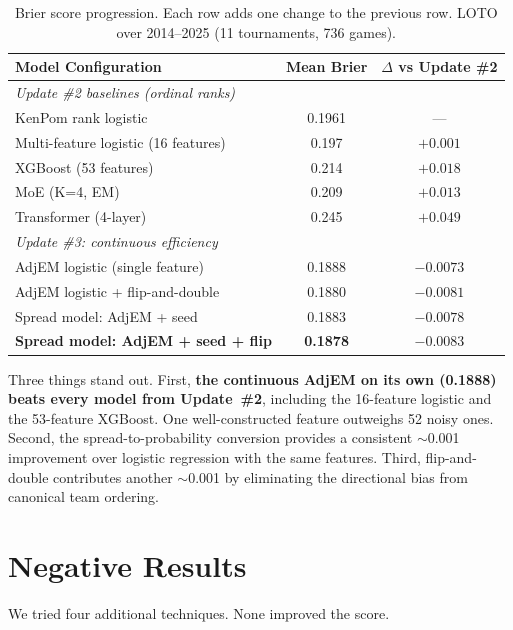 \documentclass[11pt,a4paper]{article}
\begin{document}
\begin{table}[ht]
\centering
\caption{Brier score progression. Each row adds one change to the previous row. LOTO over 2014--2025 (11 tournaments, 736 games).}
\label{tab:progression}
\small
\begin{tabular}{@{}lcc@{}}
\toprule
\textbf{Model Configuration} & \textbf{Mean Brier} & $\Delta$ \textbf{vs Update \#2} \\
\midrule
\multicolumn{3}{l}{\textit{Update \#2 baselines (ordinal ranks)}} \\
\quad KenPom rank logistic & 0.1961 & --- \\
\quad Multi-feature logistic (16 features) & 0.197 & $+0.001$ \\
\quad XGBoost (53 features) & 0.214 & $+0.018$ \\
\quad MoE (K=4, EM) & 0.209 & $+0.013$ \\
\quad Transformer (4-layer) & 0.245 & $+0.049$ \\
\midrule
\multicolumn{3}{l}{\textit{Update \#3: continuous efficiency}} \\
\quad AdjEM logistic (single feature) & 0.1888 & $-0.0073$ \\
\quad AdjEM logistic + flip-and-double & 0.1880 & $-0.0081$ \\
\quad Spread model: AdjEM + seed & 0.1883 & $-0.0078$ \\
\quad \textbf{Spread model: AdjEM + seed + flip} & \textbf{0.1878} & $\mathbf{-0.0083}$ \\
\bottomrule
\end{tabular}
\end{table}

Three things stand out. First, \textbf{the continuous AdjEM on its own (0.1888) beats every model from Update~\#2}, including the 16-feature logistic and the 53-feature XGBoost. One well-constructed feature outweighs 52 noisy ones. Second, the spread-to-probability conversion provides a consistent $\sim$0.001 improvement over logistic regression with the same features. Third, flip-and-double contributes another $\sim$0.001 by eliminating the directional bias from canonical team ordering.


\section{Negative Results}

We tried four additional techniques. None improved the score.
\end{document}
